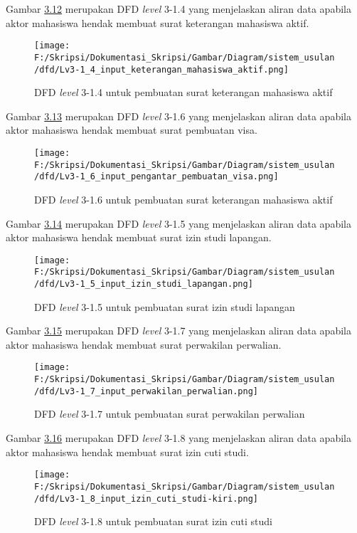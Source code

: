 Gambar \hyperlink{level_3-1.4}{3.12} merupakan DFD \textit{level} 3-1.4 yang menjelaskan aliran data apabila aktor mahasiswa hendak membuat surat keterangan mahasiswa aktif.
\begin{figure}[H]
	\centering
		\texttt{[image: F:/Skripsi/Dokumentasi\_Skripsi/Gambar/Diagram/sistem\_usulan/dfd/Lv3-1\_4\_input\_keterangan\_mahasiswa\_aktif.png]}
	\caption{DFD \textit{level} 3-1.4 untuk pembuatan surat keterangan mahasiswa aktif}
	\label{fig:level_3-1.4}
\end{figure}

Gambar \hyperlink{level_3-1.6}{3.13} merupakan DFD \textit{level} 3-1.6 yang menjelaskan aliran data apabila aktor mahasiswa hendak membuat surat pembuatan visa.
\begin{figure}[H]
	\centering
		\texttt{[image: F:/Skripsi/Dokumentasi\_Skripsi/Gambar/Diagram/sistem\_usulan/dfd/Lv3-1\_6\_input\_pengantar\_pembuatan\_visa.png]}
	\caption{DFD \textit{level} 3-1.6 untuk pembuatan surat keterangan mahasiswa aktif}
	\label{fig:level_3-1.6}
\end{figure}

Gambar \hyperlink{level_3-1.5}{3.14} merupakan DFD \textit{level} 3-1.5 yang menjelaskan aliran data apabila aktor mahasiswa hendak membuat surat izin studi lapangan.
\begin{figure}[H]
	\centering
		\texttt{[image: F:/Skripsi/Dokumentasi\_Skripsi/Gambar/Diagram/sistem\_usulan/dfd/Lv3-1\_5\_input\_izin\_studi\_lapangan.png]}
	\caption{DFD \textit{level} 3-1.5 untuk pembuatan surat izin studi lapangan}
	\label{fig:level_3-1.5}
\end{figure}

Gambar \hyperlink{level_3-1.7}{3.15} merupakan DFD \textit{level} 3-1.7 yang menjelaskan aliran data apabila aktor mahasiswa hendak membuat surat perwakilan perwalian.
\begin{figure}[H]
	\centering
		\texttt{[image: F:/Skripsi/Dokumentasi\_Skripsi/Gambar/Diagram/sistem\_usulan/dfd/Lv3-1\_7\_input\_perwakilan\_perwalian.png]}
	\caption{DFD \textit{level} 3-1.7 untuk pembuatan surat perwakilan perwalian}
	\label{fig:level_3-1.7}
\end{figure}

Gambar \hyperlink{level_3-1.8}{3.16} merupakan DFD \textit{level} 3-1.8 yang menjelaskan aliran data apabila aktor mahasiswa hendak membuat surat izin cuti studi.
\begin{figure}[H]
	\centering
		\texttt{[image: F:/Skripsi/Dokumentasi\_Skripsi/Gambar/Diagram/sistem\_usulan/dfd/Lv3-1\_8\_input\_izin\_cuti\_studi-kiri.png]}
	\caption{DFD \textit{level} 3-1.8 untuk pembuatan surat izin cuti studi}
	\label{fig:level_3-1.8}
\end{figure}

